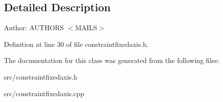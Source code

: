 \subsection{Detailed Description}
\begin{Desc}
\item[Author:]AUTHORS $<$MAILS$>$ \end{Desc}


Definition at line 30 of file constraintfixedaxis.h.

The documentation for this class was generated from the following files:\begin{CompactItemize}
\item 
src/constraintfixedaxis.h\item 
src/constraintfixedaxis.cpp\end{CompactItemize}
